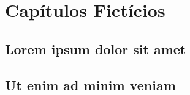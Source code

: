 \part{Capítulos Fictícios}

\chapter{Lorem ipsum dolor sit amet} \label{chap:fic1}

\lipsum[10-25]

\chapter{Ut enim ad minim veniam} \label{chap:fic2}

\lipsum[30-45]
